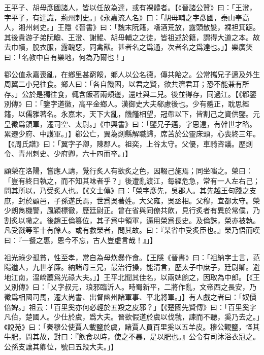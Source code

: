 王平子、胡毋彥國諸人，皆以任放為達，或有裸體者。【《晉諸公贊》曰：「王澄，字平子，有達識，荊州刺史。」《永嘉流人名》曰：「胡毋輔之字彥國，泰山奉高人，湘州刺史。」王隱《晉書》曰：「魏末阮籍，嗜酒荒放，露頭散髮，裸袒箕踞。其後貴游子弟阮瞻、王澄、謝鯤、胡毋輔之之徒，皆祖述於籍，謂得大道之本。故去巾幘，脫衣服，露醜惡，同禽獸。甚者名之爲通，次者名之爲達也。」】樂廣笑曰：「名教中自有樂地，何為乃爾也！」

郗公值永嘉喪亂，在鄉里甚窮餒，鄉人以公名德，傳共飴之。公常攜兄子邁及外生周翼二小兒往食。鄉人曰：「各自饑困，以君之賢，欲共濟君耳；恐不能兼有所存。」公於是獨往食，輒含飯著兩頰邊，還吐與二兒。後並得存，同過江。【《郗鑒別傳》曰：「鑒字道徽，高平金鄉人。漢御史大夫郗慮後也。少有體正，耽思經籍，以儒雅著名。永嘉末，天下大亂，饑饉相望，冠帶以下，皆割己之資供鑒。元皇徵爲領軍，遷司空、太尉。」《中興書》曰：「鑒兄子邁，字思遠，有幹世才略。累遷少府、中護軍。」】郗公亡，翼為剡縣解職歸，席苫於公靈床頭，心喪終三年。【《周氏譜》曰：「翼字子卿，陳郡人。祖奕，上谷太守。父優，車騎咨議。歷剡令、青州刺史、少府卿，六十四而卒。」】

顧榮在洛陽，嘗應人請，覺行炙人有欲炙之色，因輟己施焉；同坐嗤之。榮曰：「豈有終日執之，而不知其味者乎？」後遭亂渡江，每經危急，常有一人左右己；問其所以，乃受炙人也。【《文士傳》曰：「榮字彥先，吳郡人。其先越王句踐之支庶，封於顧邑，子孫遂氏焉，世爲吳著姓。大父雍，吳丞相。父穆，宜都太守。榮少朗雋機警，⾵穎標徹，歷廷尉正。曾在省與同僚共飲，見行炙者有異於常僕，乃割炙以噉之。後趙王倫篡位，其子爲中領軍，逼用榮爲長史。及倫誅，榮亦被執。凡受戮等輩十有餘人。或有救榮者，問其故。曰：『某省中受炙臣也。』榮乃悟而嘆曰：『⼀餐之惠，恩今不忘，古人豈虛言哉！』」】

祖光祿少孤貧，性至孝，常自為母炊爨作食。【王隱《晉書》曰：「祖納字士言，范陽遒人，九世孝廉。納諸母三兄，最治行操，能清言，歷太子中庶子，廷尉卿。避地江南，溫嶠薦爲光祿大夫。」】王平北聞其佳名，以兩婢餉之，因取為中郎。【《王乂別傳》曰：「乂字叔元，琅邪臨沂人。時蜀新平，⼆將作亂，文帝西之長安，乃徵爲相國司馬，遷大尚書、出督幽州諸軍事、平北將軍。」】有人戲之者曰：「奴價倍婢。」祖云：「百里奚亦何必輕於五羖之皮邪？」【《楚國先賢傳》曰：「百里奚字凡伯，楚國人。少仕於虞，爲大夫。晉欲假道於虞以伐虢，諫而不聽，奚乃去之。」《說苑》曰：「秦穆公使賈人載鹽於虞，諸賈人買百里奚以五羊皮。穆公觀鹽，怪其牛肥，問其故，對曰：『飲食以時，使之不暴，是以肥也。』公令有司沐浴衣冠之。公孫支讓其卿位，號曰五羖大夫。」】

